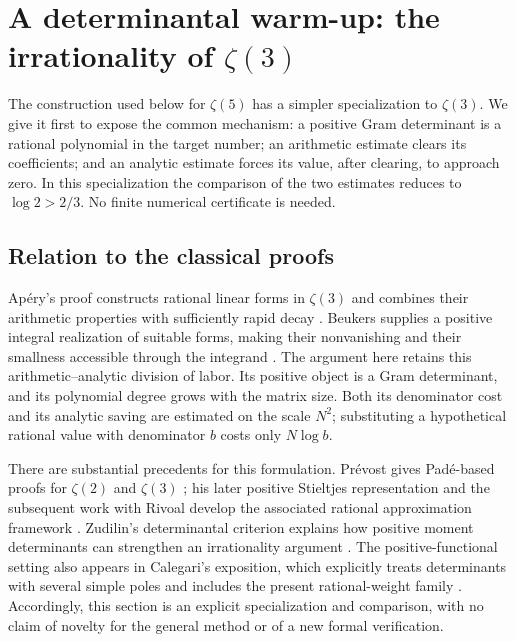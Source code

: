 \documentclass[11pt,letterpaper]{article}
\theoremstyle{definition}
\begin{document}

\section{A determinantal warm-up: the irrationality of \texorpdfstring{$\zeta(3)$}{zeta(3)}}
\label{sec:zeta3-warmup}

The construction used below for $\zeta(5)$ has a simpler specialization to
$\zeta(3)$. We give it first to expose the common mechanism: a positive
Gram determinant is a rational polynomial in the target number; an
arithmetic estimate clears its coefficients; and an analytic estimate
forces its value, after clearing, to approach zero. In this specialization
the comparison of the two estimates reduces to $\log2>2/3$. No finite
numerical certificate is needed.

\subsection{Relation to the classical proofs}

Ap\'ery's proof constructs rational linear forms in $\zeta(3)$ and combines
their arithmetic properties with sufficiently rapid decay
\cite{apery1979}. Beukers supplies a positive integral realization of
suitable forms, making their nonvanishing and their smallness accessible
through the integrand \cite{beukers1979}. The argument here retains this
arithmetic--analytic division of labor. Its positive object is a Gram
determinant, and its polynomial degree grows with the matrix size. Both
its denominator cost and its analytic saving are estimated on the scale
$N^2$; substituting a hypothetical rational value with denominator $b$
costs only $N\log b$.

There are substantial precedents for this formulation. Pr\'evost gives
Pad\'e-based proofs for $\zeta(2)$ and $\zeta(3)$
\cite{prevost1996}; his later positive Stieltjes representation and the
subsequent work with Rivoal develop the associated rational approximation
framework \cite{prevost2019,prevostrivoal2021}. Zudilin's determinantal
criterion explains how positive moment determinants can strengthen an
irrationality argument \cite{zudilin2017}. The positive-functional setting
also appears in Calegari's exposition, which explicitly treats determinants
with several simple poles and includes the present rational-weight family
\cite{calegari2026}. Accordingly,
this section is an explicit specialization and comparison, with no claim
of novelty for the general method or of a new formal verification.
\end{document}
